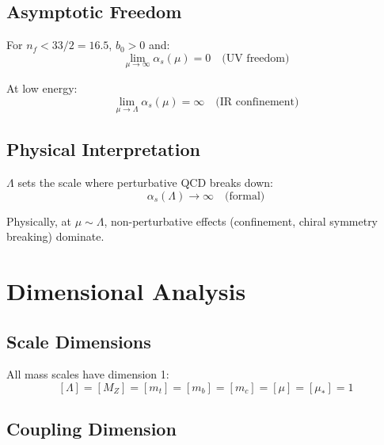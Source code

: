 \documentclass[11pt,a4paper]{article}
\theoremstyle{definition}
\begin{document}
\subsection{Asymptotic Freedom}
\label{subsec:asymptotic-freedom}

For $n_f < 33/2 = 16.5$, $b_0 > 0$ and:
\begin{equation}
\label{eq:asymptotic-uv}
\lim_{\mu \to \infty} \alpha_s(\mu) = 0 \quad \text{(UV freedom)}
\end{equation}

At low energy:
\begin{equation}
\label{eq:confinement-ir}
\lim_{\mu \to \Lambda} \alpha_s(\mu) = \infty \quad \text{(IR confinement)}
\end{equation}

\subsection{Physical Interpretation}
\label{subsec:physical-interp}

$\Lambda$ sets the scale where perturbative QCD breaks down:
\begin{equation}
\label{eq:lambda-physical}
\alpha_s(\Lambda) \to \infty \quad \text{(formal)}
\end{equation}

Physically, at $\mu \sim \Lambda$, non-perturbative effects (confinement,
chiral symmetry breaking) dominate.

\section{Dimensional Analysis}
\label{sec:dim-analysis}

\subsection{Scale Dimensions}
\label{subsec:scale-dims}

All mass scales have dimension 1:
\begin{equation}
\label{eq:dim-scales}
[\Lambda] = [M_Z] = [m_t] = [m_b] = [m_c] = [\mu] = [\mu_*] = 1
\end{equation}

\subsection{Coupling Dimension}
\label{subsec:coupling-dim}
\end{document}
